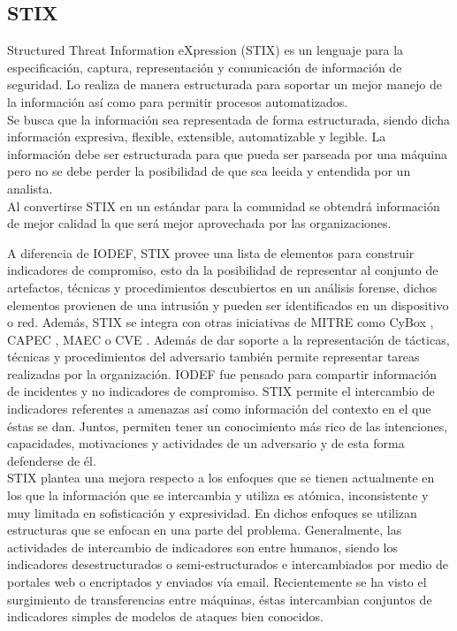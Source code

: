 \subsection{STIX}

Structured Threat Information eXpression (STIX) es un lenguaje para la especificación, captura, representación y 
comunicación de información de seguridad. Lo realiza de manera 
estructurada para soportar un mejor manejo de la información así como para 
permitir procesos automatizados.\\

Se busca que la información sea representada de forma estructurada, siendo dicha información expresiva, flexible, extensible, automatizable y legible. La información debe ser estructurada para que pueda ser parseada por una máquina pero no se debe perder la posibilidad de que sea leeida y entendida por un analista. \\

Al convertirse STIX en un estándar para la comunidad se obtendrá información de 
mejor calidad la que será mejor aprovechada por las organizaciones.

A diferencia de IODEF, STIX provee una lista de elementos para construir 
indicadores de compromiso, esto da la posibilidad de representar al conjunto de artefactos, técnicas y procedimientos descubiertos en un análisis forense, dichos elementos provienen de una intrusión y pueden ser identificados en un dispositivo o red. Además, STIX se integra con otras iniciativas de MITRE como CyBox \cite{cybox}, CAPEC \cite{capec}, MAEC \cite{maec} o CVE \cite{cve}. Además de dar soporte a la representación de tácticas, técnicas y procedimientos del adversario también permite representar tareas 
realizadas por la organización. IODEF fue pensado para compartir información de 
incidentes y no indicadores de compromiso. STIX permite el intercambio de 
indicadores referentes a amenazas así como información del contexto en el que 
éstas se dan. Juntos, permiten tener un conocimiento más rico de las 
intenciones, capacidades, motivaciones y actividades de un adversario y de esta 
forma defenderse de él.\\

STIX plantea una mejora respecto a los enfoques que se tienen actualmente en los que la información que se intercambia y utiliza es atómica, inconsistente 
y muy limitada en sofisticación y expresividad. En dichos enfoques se utilizan estructuras que se enfocan en una parte del problema. %
Generalmente, las actividades de intercambio de indicadores son entre humanos, 
siendo los indicadores desestructurados o semi-estructurados e intercambiados 
por medio de portales web o encriptados y enviados vía email. Recientemente se 
ha visto el surgimiento de transferencias entre máquinas, éstas intercambian 
conjuntos de indicadores simples de modelos de ataques bien conocidos.\\



